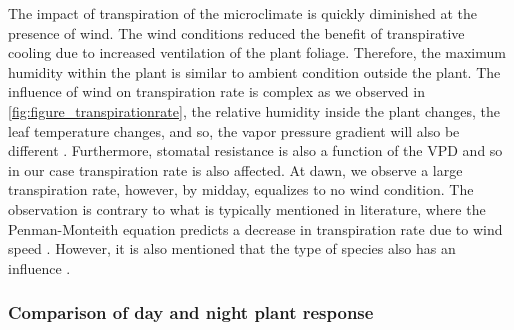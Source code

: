 The impact of transpiration of the microclimate is quickly diminished at the presence of wind. The wind conditions reduced the benefit of transpirative cooling due to increased ventilation of the plant foliage. Therefore, the maximum humidity within the plant is similar to ambient condition outside the plant. The influence of wind on transpiration rate is complex as we observed in \cref{fig:figure_transpirationrate}, the relative humidity inside the plant changes, the leaf temperature changes, and so, the vapor pressure gradient will also be different \citep{Manickathan2018a}. Furthermore, stomatal resistance is also a function of the VPD and so in our case transpiration rate is also affected. At dawn, we observe a large transpiration rate, however, by midday, equalizes to no wind condition. The observation is contrary to what is typically mentioned in literature, where the Penman-Monteith equation predicts a decrease in transpiration rate due to wind speed \citep{Dixon1983, Schymanski2016}. However, it is also mentioned that the type of species also has an influence \citep{Dixon1983}. 

\subsubsection*{Comparison of day and night plant response}

